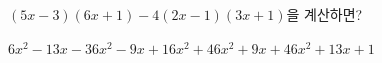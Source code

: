 $(5x-3)(6x+1)-4(2x-1)(3x+1)$을 계산하면?
\begin{choicesii}{$6x^2-13x-3$}{$6x^2-9x+1$}{$6x^2+4$}{$6x^2+9x+4$}{$6x^2+13x+1$}\end{choicesii}
